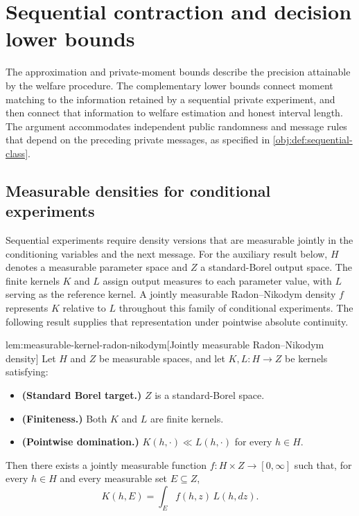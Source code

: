 \section{Sequential contraction and decision lower bounds}

The approximation and private-moment bounds describe the precision attainable by the welfare procedure. The complementary lower bounds connect moment matching to the information retained by a sequential private experiment, and then connect that information to welfare estimation and honest interval length. The argument accommodates independent public randomness and message rules that depend on the preceding private messages, as specified in \cref{obj:def:sequential-class}.

\subsection{Measurable densities for conditional experiments}

Sequential experiments require density versions that are measurable jointly in the conditioning variables and the next message. For the auxiliary result below, \(H\) denotes a measurable parameter space and \(Z\) a standard-Borel output space. The finite kernels \(K\) and \(L\) assign output measures to each parameter value, with \(L\) serving as the reference kernel. A jointly measurable Radon--Nikodym density \(f\) represents \(K\) relative to \(L\) throughout this family of conditional experiments. The following result supplies that representation under pointwise absolute continuity.

\begin{theoremv}{lem:measurable-kernel-radon-nikodym}[Jointly measurable Radon–Nikodym density]
Let \(H\) and \(Z\) be measurable spaces, and let \(K,L:H\to Z\) be kernels satisfying:
\begin{itemize}
\item \textbf{(Standard Borel target.)} \(Z\) is a standard-Borel space.
\item \textbf{(Finiteness.)} Both \(K\) and \(L\) are finite kernels.
\item \textbf{(Pointwise domination.)} \(K(h,\cdot)\ll L(h,\cdot)\) for every \(h\in H\).
\end{itemize}
Then there exists a jointly measurable function \(f:H\times Z\to[0,\infty]\) such that, for every \(h\in H\) and every measurable set \(E\subseteq Z\),
\[
K(h,E)=\int_E f(h,z)\,L(h,dz).
\]
\end{theoremv}

